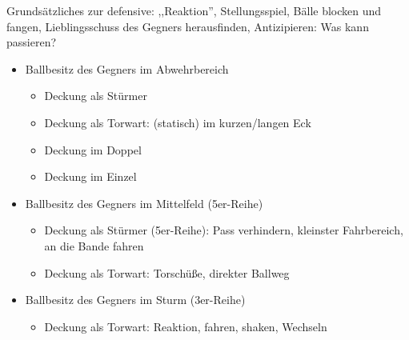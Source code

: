 Grundsätzliches zur \gls{defensive}: ,,Reaktion'', Stellungsspiel, Bälle blocken und fangen, Lieblingsschuss des Gegners herausfinden, Antizipieren: Was kann passieren?
\begin{itemize}
\item Ballbesitz des Gegners im Abwehrbereich 
\begin{itemize}
\item Deckung als Stürmer
\item Deckung als Torwart: (statisch) im kurzen/langen Eck
\item Deckung im Doppel
\item Deckung im Einzel
\end{itemize}
\item Ballbesitz des Gegners im Mittelfeld (5er-Reihe)
\begin{itemize}
\item Deckung als Stürmer (5er-Reihe): Pass verhindern, kleinster Fahrbereich, an die Bande fahren
\item Deckung als Torwart: Torschüße, direkter Ballweg
\end{itemize}
\item Ballbesitz des Gegners im Sturm (3er-Reihe)
\begin{itemize}
\item Deckung als Torwart: Reaktion, fahren, shaken, Wechseln
\end{itemize}
\end{itemize}




